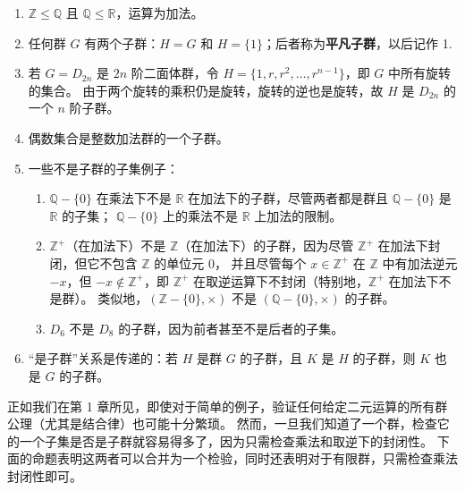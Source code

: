 \begin{example}\label{exa:2.1}
\begin{enumerate}[label=(\arabic*)]
\item \(\mathbb{Z} \leq \mathbb{Q}\) 且 \(\mathbb{Q} \leq \mathbb{R}\)，运算为加法。

\item 任何群 \( G \) 有两个子群：\( H = G \) 和 \( H = \{1\} \)；后者称为\textbf{平凡子群}，以后记作 1.

\item 若 \( G = D_{2n} \) 是 \( 2n \) 阶二面体群，令 \( H = \{1, r, r^2, \ldots, r^{n-1}\} \)，即 \( G \) 中所有旋转的集合。
由于两个旋转的乘积仍是旋转，旋转的逆也是旋转，故 \( H \) 是 \( D_{2n} \) 的一个 \( n \) 阶子群。

\item 偶数集合是整数加法群的一个子群。

\item 一些不是子群的子集例子：
\begin{enumerate}
\item \(\mathbb{Q} - \{0\}\) 在乘法下不是 \(\mathbb{R}\) 在加法下的子群，尽管两者都是群且 \(\mathbb{Q} - \{0\}\) 是 \(\mathbb{R}\) 的子集；%
\(\mathbb{Q} - \{0\}\) 上的乘法不是 \(\mathbb{R}\) 上加法的限制。
\item \(\mathbb{Z}^+\)（在加法下）不是 \(\mathbb{Z}\)（在加法下）的子群，因为尽管 \(\mathbb{Z}^+\) 在加法下封闭，但它不包含 \(\mathbb{Z}\) 的单位元 \(0\)，
并且尽管每个 \(x \in \mathbb{Z}^+\) 在 \(\mathbb{Z}\) 中有加法逆元 \(-x\)，但 \(-x \notin \mathbb{Z}^+\)，即 \(\mathbb{Z}^+\) 在取逆运算下不封闭（特别地，\(\mathbb{Z}^+\) 在加法下不是群）。
类似地，\((\mathbb{Z} - \{0\}, \times)\) 不是 \((\mathbb{Q} - \{0\}, \times)\) 的子群。
\item \(D_6\) 不是 \(D_8\) 的子群，因为前者甚至不是后者的子集。
\end{enumerate}

\item “是子群”关系是传递的：若 \( H \) 是群 \( G \) 的子群，且 \( K \) 是 \( H \) 的子群，则 \( K \) 也是 \( G \) 的子群。
\end{enumerate}
\end{example}

正如我们在第 1 章所见，即使对于简单的例子，验证任何给定二元运算的所有群公理（尤其是结合律）也可能十分繁琐。
然而，一旦我们知道了一个群，检查它的一个子集是否是子群就容易得多了，因为只需检查乘法和取逆下的封闭性。
下面的命题表明这两者可以合并为一个检验，同时还表明对于有限群，只需检查乘法封闭性即可。

